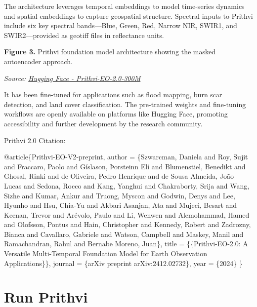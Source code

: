 \documentclass[
  letterpaper,
  DIV=11,
  numbers=noendperiod]{scrreprt}
\newenvironment{Shaded}{\begin{snugshade}}{\end{snugshade}}
\newcommand{\DataTypeTok}[1]{\textcolor[rgb]{0.68,0.00,0.00}{#1}}
\newcommand{\NormalTok}[1]{\textcolor[rgb]{0.00,0.23,0.31}{#1}}
\newcommand{\OtherTok}[1]{\textcolor[rgb]{0.00,0.23,0.31}{#1}}
\newcommand{\VariableTok}[1]{\textcolor[rgb]{0.07,0.07,0.07}{#1}}
\begin{document}
The architecture leverages temporal embeddings to model time-series
dynamics and spatial embeddings to capture geospatial structure.
Spectral inputs to Prithvi include six key spectral bands---Blue, Green,
Red, Narrow NIR, SWIR1, and SWIR2---provided as geotiff files in
reflectance units.

\textbf{Figure 3.} Prithvi foundation model architecture showing the
masked autoencoder approach.

\emph{Source:
\href{https://huggingface.co/ibm-nasa-geospatial/Prithvi-EO-2.0-300M}{Hugging
Face - Prithvi-EO-2.0-300M}}

It has been fine-tuned for applications such as flood mapping, burn scar
detection, and land cover classification. The pre-trained weights and
fine-tuning workflows are openly available on platforms like Hugging
Face, promoting accessibility and further development by the research
community.

Prithvi 2.0 Citation:

\begin{Shaded}
\begin{Highlighting}[]
\VariableTok{@article}\NormalTok{\{}\OtherTok{Prithvi}\NormalTok{{-}}\OtherTok{EO}\NormalTok{{-}}\OtherTok{V2}\NormalTok{{-}}\OtherTok{preprint}\NormalTok{,    }
    \DataTypeTok{author}\NormalTok{          = \{Szwarcman, Daniela and Roy, Sujit and Fraccaro, Paolo and Gíslason, Þorsteinn Elí and Blumenstiel, Benedikt and Ghosal, Rinki and de Oliveira, Pedro Henrique and de Sousa Almeida, João Lucas and Sedona, Rocco and Kang, Yanghui and Chakraborty, Srija and Wang, Sizhe and Kumar, Ankur and Truong, Myscon and Godwin, Denys and Lee, Hyunho and Hsu, Chia{-}Yu and Akbari Asanjan, Ata and Mujeci, Besart and Keenan, Trevor and Arévolo, Paulo and Li, Wenwen and Alemohammad, Hamed and Olofsson, Pontus and Hain, Christopher and Kennedy, Robert and Zadrozny, Bianca and Cavallaro, Gabriele and Watson, Campbell and Maskey, Manil and Ramachandran, Rahul and Bernabe Moreno, Juan\},}
    \DataTypeTok{title}\NormalTok{           = \{\{Prithvi{-}EO{-}2.0: A Versatile Multi{-}Temporal Foundation Model for Earth Observation Applications\}\},}
    \DataTypeTok{journal}\NormalTok{         = \{arXiv preprint arXiv:2412.02732\},}
    \DataTypeTok{year}\NormalTok{            = \{2024\}}
\NormalTok{\}}
\end{Highlighting}
\end{Shaded}

\section{Run Prithvi}\label{run-prithvi}
\end{document}
